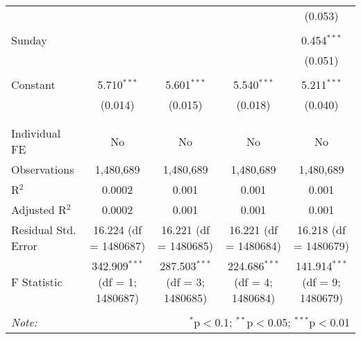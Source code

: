 \documentclass[
]{article}
\begin{document}
\begin{table}[!htbp]
{\begin{tabular}{@{\extracolsep{5pt}}lcccc}
  &  &  &  & (0.053) \\ 
  & & & & \\ 
 Sunday &  &  &  & 0.454$^{***}$ \\ 
  &  &  &  & (0.051) \\ 
  & & & & \\ 
 Constant & 5.710$^{***}$ & 5.601$^{***}$ & 5.540$^{***}$ & 5.211$^{***}$ \\ 
  & (0.014) & (0.015) & (0.018) & (0.040) \\ 
  & & & & \\ 
\hline \\[-1.8ex] 
Individual FE & No & No & No & No \\ 
Observations & 1,480,689 & 1,480,689 & 1,480,689 & 1,480,689 \\ 
R$^{2}$ & 0.0002 & 0.001 & 0.001 & 0.001 \\ 
Adjusted R$^{2}$ & 0.0002 & 0.001 & 0.001 & 0.001 \\ 
Residual Std. Error & 16.224 (df = 1480687) & 16.221 (df = 1480685) & 16.221 (df = 1480684) & 16.218 (df = 1480679) \\ 
F Statistic & 342.909$^{***}$ (df = 1; 1480687) & 287.503$^{***}$ (df = 3; 1480685) & 224.686$^{***}$ (df = 4; 1480684) & 141.914$^{***}$ (df = 9; 1480679) \\ 
\hline 
\hline \\[-1.8ex] 
\textit{Note:}  & \multicolumn{4}{r}{$^{*}$p$<$0.1; $^{**}$p$<$0.05; $^{***}$p$<$0.01} \\ 
\end{tabular}
} 
\end{table} 
\newpage
\end{document}
